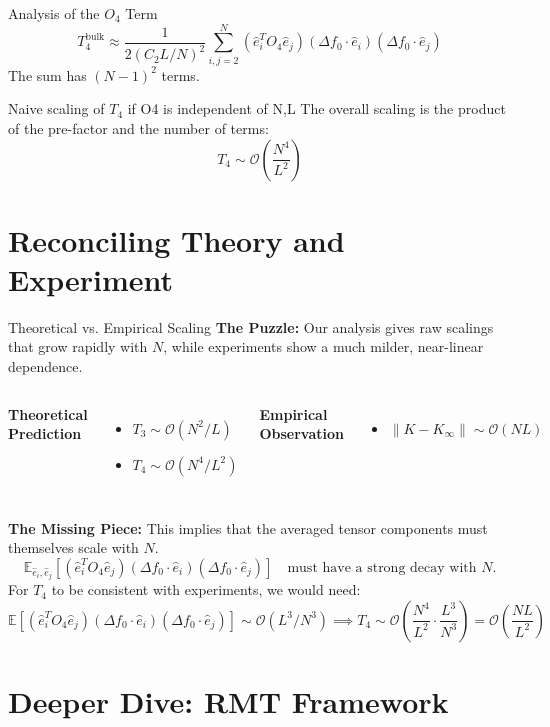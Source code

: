\documentclass{beamer}
\newcommand{\Order}{\mathcal{O}}
\begin{document}
\begin{frame}{Analysis of the $O_4$ Term}
\[
T_4^{\text{bulk}} \approx \frac{1}{2(C_2 L/N)^2} \sum_{i,j=2}^N (\hat{e}_{i}^{T}O_{4}\hat{e}_{j})(\Delta f_{0}\cdot \hat{e}_{i})(\Delta f_{0}\cdot \hat{e}_{j})
\]
The sum has $(N-1)^2$ terms.
\begin{alertblock}{Naive scaling of $T_4$ if O4 is independent of N,L}
The overall scaling is the product of the pre-factor and the number of terms:
\[ T_4 \sim \Order\left(\frac{N^4}{L^2}\right) \]
\end{alertblock}
\end{frame}

\section{Reconciling Theory and Experiment}

\begin{frame}{Theoretical vs. Empirical Scaling}
\textbf{The Puzzle:} Our analysis gives raw scalings that grow rapidly with $N$, while experiments show a much milder, near-linear dependence.
\begin{columns}
\textbf{Theoretical Prediction}
\begin{itemize}
    \item $T_3 \sim \Order(N^2/L)$
    \item $T_4 \sim \Order(N^4/L^2)$
\end{itemize}
\textbf{Empirical Observation}
\begin{itemize}
    \item $\|K - K_\infty\| \sim \Order(NL)$
\end{itemize}
\end{columns}
\vspace{1cm}
\textbf{The Missing Piece:}
This implies that the averaged tensor components must themselves scale with $N$.
\[
\mathbb{E}_{\hat{e}_i, \hat{e}_j}[(\hat{e}_{i}^{T}O_{4}\hat{e}_{j})(\Delta f_{0}\cdot \hat{e}_{i})(\Delta f_{0}\cdot \hat{e}_{j})] \quad \text{must have a strong decay with } N.
\]
For $T_4$ to be consistent with experiments, we would need:
\[
\mathbb{E}[(\hat{e}_{i}^{T}O_{4}\hat{e}_{j})(\Delta f_{0}\cdot \hat{e}_{i})(\Delta f_{0}\cdot \hat{e}_{j})] \sim \Order(L^3/N^3) \implies T_4 \sim \Order\left(\frac{N^4}{L^2} \cdot \frac{L^3}{N^3}\right) = \Order\left(\frac{N L}{L^2}\right)
\]
\end{frame}

\section{Deeper Dive: RMT Framework}
\end{document}
